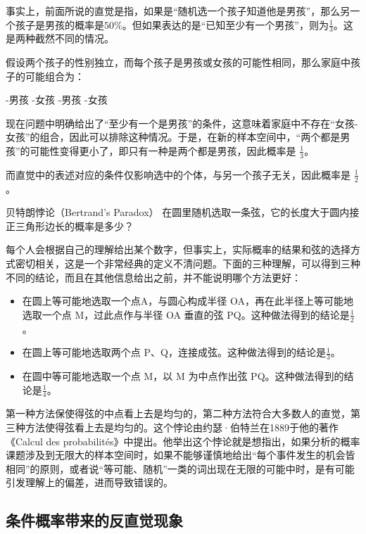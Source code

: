 事实上，前面所说的直觉是指，如果是“随机选一个孩子知道他是男孩”，那么另一个孩子是男孩的概率是$50\%$。但如果表达的是“已知至少有一个男孩”，则为$\displaystyle \frac{1}{3}$。这是两种截然不同的情况。

假设两个孩子的性别独立，而每个孩子是男孩或女孩的可能性相同，那么家庭中孩子的可能组合为：

\begin{itemize}
-男孩
-女孩
-男孩
-女孩
\end{itemize}

现在问题中明确给出了“至少有一个是男孩”的条件，这意味着家庭中不存在“女孩-女孩”的组合，因此可以排除这种情况。于是，在新的样本空间中，“两个都是男孩”的可能性变得更小了，即只有一种是两个都是男孩，因此概率是 $\displaystyle\frac{1}{3}$。

而直觉中的表述对应的条件仅影响选中的个体，与另一个孩子无关，因此概率是 $\displaystyle\frac{1}{2}$。

\begin{example}{贝特朗悖论（Bertrand's Paradox）}
在圆里随机选取一条弦，它的长度大于圆内接正三角形边长的概率是多少？
\end{example}

每个人会根据自己的理解给出某个数字，但事实上，实际概率的结果和弦的选择方式密切相关，这是一个非常经典的定义不清问题。下面的三种理解，可以得到三种不同的结论，而且在其他信息给出之前，并不能说明哪个方法更好：

\begin{itemize}
\item 在圆上等可能地选取一个点A，与圆心构成半径 OA，再在此半径上等可能地选取一个点 M，过此点作与半径 OA 垂直的弦 PQ。这种做法得到的结论是$\displaystyle\frac{1}{2}$。
\item 在圆上等可能地选取两个点 P、Q，连接成弦。这种做法得到的结论是$\displaystyle\frac{1}{3}$。
\item 在圆中等可能地选取一个点 M，以 M 为中点作出弦 PQ。这种做法得到的结论是$\displaystyle\frac{1}{4}$。
\end{itemize}

第一种方法保使得弦的中点看上去是均匀的，第二种方法符合大多数人的直觉，第三种方法使得弦看上去是均匀的。这个悖论由约瑟·伯特兰在1889于他的著作《Calcul des probabilités》中提出。他举出这个悖论就是想指出，如果分析的概率课题涉及到无限大的样本空间时，如果不能够谨慎地给出“每个事件发生的机会皆相同”的原则，或者说“等可能、随机”一类的词出现在无限的可能中时，是有可能引发理解上的偏差，进而导致错误的。

\subsection{条件概率带来的反直觉现象}

